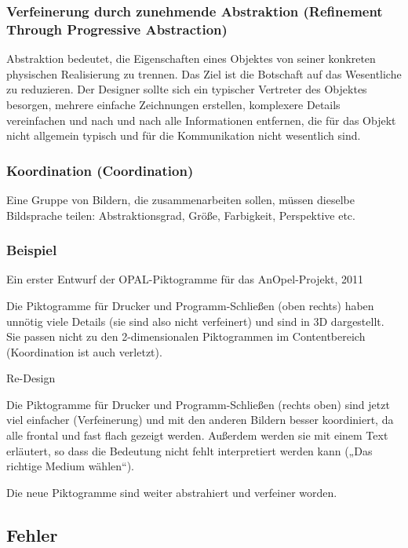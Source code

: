 \subsubsection*{Verfeinerung durch zunehmende Abstraktion (Refinement Through Progressive Abstraction)}
Abstraktion bedeutet, die Eigenschaften eines Objektes von seiner konkreten physischen Realisierung zu trennen. Das Ziel ist die Botschaft auf das Wesentliche zu reduzieren. Der Designer sollte sich ein typischer Vertreter des Objektes besorgen, mehrere einfache Zeichnungen erstellen, komplexere Details vereinfachen und nach und nach alle Informationen entfernen, die für das Objekt nicht allgemein typisch und für die Kommunikation nicht wesentlich sind.
 
\subsubsection*{Koordination (Coordination)}
Eine Gruppe von Bildern, die zusammenarbeiten sollen, müssen dieselbe Bildsprache teilen: Abstraktionsgrad, Größe, Farbigkeit, Perspektive etc.

\subsubsection{Beispiel}
Ein erster Entwurf der OPAL-Piktogramme  für das AnOpel-Projekt, 2011

Die Piktogramme für Drucker und Programm-Schließen (oben rechts) haben unnötig viele Details (sie sind also nicht verfeinert) und sind in 3D dargestellt. Sie passen nicht zu den 2-dimensionalen Piktogrammen im Contentbereich (Koordination ist auch verletzt). 

Re-Design

Die Piktogramme für Drucker und Programm-Schließen (rechts oben) sind jetzt viel einfacher (Verfeinerung) und mit den anderen Bildern besser koordiniert, da alle frontal und fast flach gezeigt werden. Außerdem werden sie mit einem Text erläutert, so dass die Bedeutung nicht fehlt interpretiert werden kann („Das richtige Medium wählen“).

Die neue Piktogramme sind weiter abstrahiert und verfeiner worden.

\subsection{Fehler}

